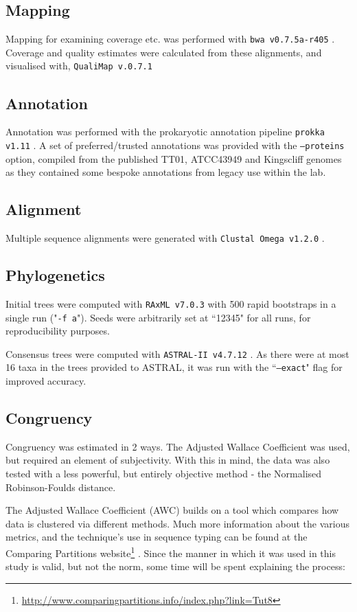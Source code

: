 \subsection{Mapping}
Mapping for examining coverage etc. was performed with \texttt{bwa v0.7.5a-r405} \citep{Li2009}. Coverage and quality estimates were calculated from these alignments, and visualised with, \texttt{QualiMap v.0.7.1} \citep{Garcia-Alcalde2012}

\subsection{Annotation}\label{prokka}
Annotation was performed with the prokaryotic annotation pipeline \texttt{prokka v1.11} \citep{Seemann2014}. A set of preferred/trusted annotations was provided with the \texttt{--proteins} option, compiled from the published \Plum{} TT01,  \Pasy{} ATCC43949 and \Pasy{} Kingscliff genomes as they contained some bespoke annotations from legacy use within the lab.

\subsection{Alignment}
Multiple sequence alignments were generated with \texttt{Clustal Omega v1.2.0} \citep{Sievers2011}.

\subsection{Phylogenetics}
Initial trees were computed with \texttt{RAxML v7.0.3} \citep{Stamatakis2006} with 500 rapid bootstraps in a single run ("\texttt{-f a}"). Seeds were arbitrarily set at ``12345" for all runs, for reproducibility purposes.

Consensus trees were computed with \texttt{ASTRAL-II v4.7.12} \citep{Mirarab2015}. As there were at most 16 taxa in the trees provided to ASTRAL, it was run with the ``\texttt{--exact}" flag for improved accuracy.

\subsection{Congruency}
Congruency was estimated in 2 ways. The Adjusted Wallace Coefficient was used, but required an element of subjectivity. With this in mind, the data was also tested with a less powerful, but entirely objective method - the Normalised Robinson-Foulds distance.

The Adjusted Wallace Coefficient (AWC) builds on a tool which compares how data is clustered via different methods. Much more information about the various metrics, and the technique's use in sequence typing can be found at the Comparing Partitions website\footnote{\url{http://www.comparingpartitions.info/index.php?link=Tut8}} \citep{Pinto2008, Severiano2011a, Severiano2011b, Carrico2006}. Since the manner in which it was used in this study is valid, but not the norm, some time will be spent explaining the process:

